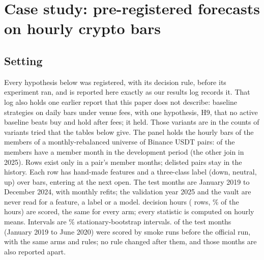 \documentclass[11pt]{article}
\newcommand{\pct}{\%}
\begin{document}
\section{Case study: pre-registered forecasts on hourly crypto bars}\label{sec:case}

\subsection{Setting}
Every hypothesis below was registered, with its decision rule, before its experiment ran, and is
reported here exactly as our results log records it. That log also holds one earlier report that this paper does not describe: \NumVariantsBefore{}
baseline strategies on daily bars under venue fees, with one hypothesis, H9, that no active
baseline beats buy and hold after fees; it held. Those \NumVariantsBefore{} variants are in the
counts of variants tried that the tables below give. The panel holds the hourly bars of the members
of a monthly-rebalanced universe of Binance USDT pairs: \NumPanelMembers{} of the \NumPanelAll{}
members have a member month in the development period (the other \NumPanelLate{} join in 2025).
Rows exist only in a pair's member months; delisted pairs stay in the history. Each row has
\NumFeatures{} hand-made features and a three-class label (down, neutral, up) over
\NumLabelBars{} bars, entering at the next open. The test months are January 2019 to December 2024,
with monthly refits; the validation year 2025 and the vault are never read for a feature, a label or
a model. \NumScoredHours{} decision hours (\NumScoredRows{} rows, \NumScoredShare\pct{} of the
hours) are scored, the same for every arm; every statistic is computed on hourly means. Intervals are
\NumConf\pct{} stationary-bootstrap intervals. \NumPreviewMonths{} of the \NumTestMonths{} test
months (January 2019 to June 2020) were scored by smoke runs before the official run, with the same
arms and rules; no rule changed after them, and those months are also reported apart.
\end{document}

